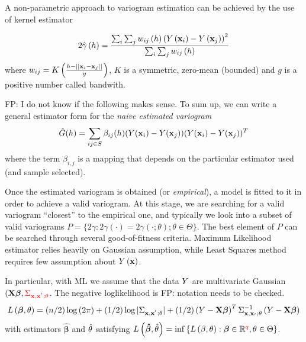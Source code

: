 A non-parametric approach to variogram estimation can be achieved by the use of kernel estimator

\begin{equation}
2\hat{\gamma}\left(h\right)=\frac{\sum_{i}\sum_{j}{w_{ij}\left(h\right)\left(Y\left(\mathbf{x}_{i}\right)-Y\left(\mathbf{x}_{j}\right)\right)^{2}}}{\sum_{i}\sum_{j}{w_{ij}\left(h\right)}}
\end{equation}
where $w_{ij}=K\left(\frac{h-||\mathbf{x}_{i}-\mathbf{x}_{j}||}{g}\right)$, $K$ is a symmetric, zero-mean (bounded) and $g$ is a positive number called bandwith.

{\color{red}FP: I do not know if the following makes sense.} To sum up, we can write a general estimator form for the \emph{naive estimated variogram}
\begin{equation} \label{eq:g_hat}
    \hat{G}(h)=\sum_{ij\in S}{\beta_{ij}(h)(Y(\mathbf{x}_{i})-Y(\mathbf{x}_{j}))(Y(\mathbf{x}_{i})-Y(\mathbf{x}_{j}))^{T}}
\end{equation}
where the term $\beta_{i,j}$ is a mapping that depends on the particular estimator used (and sample selected).

Once the estimated variogram is obtained (or \emph{empirical}), a model is fitted to it in order to achieve a valid variogram. At this stage, we are searching for a valid variogram ``closest'' to the empirical one, and typically we look into a subset of valid variograms $P=\lbrace2\gamma:2\gamma\left(\cdot\right)=2\gamma\left(\cdot;\theta\right);\theta\in\Theta\rbrace$. The best element of $P$ can be searched through several good-of-fitness criteria. Maximum Likelihood estimator relies heavily on Gaussian assumption, while Least Squares method requires few assumption about $Y\left(\mathbf{x}\right)$.

In particular, with ML we assume that the data $Y$ are multivariate Gaussian $(\textbf{X}\boldsymbol{\beta},{\color{red}\Sigma_{\mathbf{x},\mathbf{x}^{'};\theta}}$. The negative loglikelihood is {\color{red} FP: notation needs to be checked.} 
\begin{equation} \label{fit:ML}
L\left(\boldsymbol{\beta},\theta\right)=\left(n/2\right)\log{\left(2\pi\right)}+\left(1/2\right)\log{|\Sigma_{\mathbf{x},\mathbf{x}^{'};\theta}|}
+\left(1/2\right)\left(Y-\textbf{X}\boldsymbol{\beta}\right)^{T}\Sigma_{\mathbf{x},\mathbf{x}_{'};\theta}^{-1}\left(Y-\textbf{X}\boldsymbol{\beta}\right)
\end{equation}
with estimators $\boldsymbol{\hat{\beta}}$ and $\hat{\theta}$ satisfying $L\left(\boldsymbol{\hat{\beta}},\hat{\theta}\right)=\inf{\lbrace L\left(\beta,\theta\right):\boldsymbol{\beta}\in\mathbb{R}^{{\color{red}q}},\theta\in\Theta\rbrace}$.

